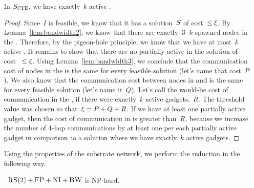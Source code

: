 \begin{lemma}
  In $S_{\mathrm{\textsc{CTE}}}$, we have exactly~$k$ active
  {\TripleGadgets}.
  \label{lem:full-or-empty}
\end{lemma}

\begin{proof}
  Since~$I$ is feasible, we know that it has a solution~$S$ of
  cost~$\leq \xi$.
  By Lemma~\ref{lem:bandwidth2}, we know that there are
  exactly~$3\cdot k$ spawned nodes in the {\MatchSubtree}. Therefore, by
  the pigeon-hole principle, we know that we have at most~$k$
  active {\TripleGadgets}. It remains to show that there
  are no partially active {\TripleGadgets} in the solution of cost
 ~$\leq \xi$.
  Using Lemma~\ref{lem:bandwidth3}, 
  we conclude that the communication cost of
  nodes in the {\CoverSubtree} is the same for every feasible solution
  (let's name that cost~$P$). We also know that the communication cost
  between nodes in {\CoverSubtree} and {\MatchSubtree} is the same for
  every feasible solution (let's name it~$Q$). Let's call the
  would-be cost of communication in the {\MatchSubtree}, if there were
  exactly~$k$ active gadgets,~$R$.
  The threshold value was chosen so that~$\xi = P+Q+R$. If we have at least one partially active
  gadget, then the cost of communication in {\MatchSubtree} is greater
  than~$R$, because we increase the number of 4-hop communications by
  at least one per each partially active gadget in comparison to a solution
  where we have exactly~$k$ active gadgets.
\end{proof}

Using the properties of the substrate network, we perform the reduction in the following way.

\begin{theorem}
 ~$\textsc{RS}(2)+\textsc{FP}+\textsc{NI}+\textsc{BW}$ is NP-hard.
\end{theorem}

